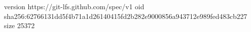 version https://git-lfs.github.com/spec/v1
oid sha256:62766131dd5f4b71a1d26140415fd2b282e9000856a943712e989fed483cb227
size 25372
